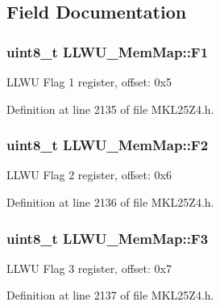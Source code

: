 \subsection{Field Documentation}
\subsubsection[{\texorpdfstring{F1}{F1}}]{\setlength{\rightskip}{0pt plus 5cm}uint8\+\_\+t L\+L\+W\+U\+\_\+\+Mem\+Map\+::\+F1}\hypertarget{struct_l_l_w_u___mem_map_acb7ec83bb70ec1313cd2e0682b1ee75c}{}\label{struct_l_l_w_u___mem_map_acb7ec83bb70ec1313cd2e0682b1ee75c}
L\+L\+WU Flag 1 register, offset\+: 0x5 

Definition at line 2135 of file M\+K\+L25\+Z4.\+h.

\subsubsection[{\texorpdfstring{F2}{F2}}]{\setlength{\rightskip}{0pt plus 5cm}uint8\+\_\+t L\+L\+W\+U\+\_\+\+Mem\+Map\+::\+F2}\hypertarget{struct_l_l_w_u___mem_map_a108405432abc40a34ccbb2c0d7ecfdb4}{}\label{struct_l_l_w_u___mem_map_a108405432abc40a34ccbb2c0d7ecfdb4}
L\+L\+WU Flag 2 register, offset\+: 0x6 

Definition at line 2136 of file M\+K\+L25\+Z4.\+h.

\subsubsection[{\texorpdfstring{F3}{F3}}]{\setlength{\rightskip}{0pt plus 5cm}uint8\+\_\+t L\+L\+W\+U\+\_\+\+Mem\+Map\+::\+F3}\hypertarget{struct_l_l_w_u___mem_map_a47d12785dc2fc2afa376e2398c7619f1}{}\label{struct_l_l_w_u___mem_map_a47d12785dc2fc2afa376e2398c7619f1}
L\+L\+WU Flag 3 register, offset\+: 0x7 

Definition at line 2137 of file M\+K\+L25\+Z4.\+h.

